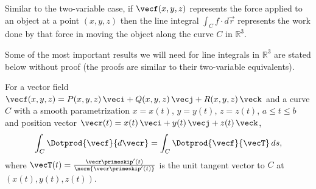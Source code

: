 Similar to the two-variable case, if $\vecf(x,y,z)$ represents the force applied to an object at a point $(x,y,z)$ then the line integral $\int_{C}{f}\cdot d\vec{r}$ represents the work done by that force in moving the object along the curve $C$ in $\mathbb{R}^{3}$.

Some of the most important results we will need for line integrals in $\mathbb{R}^{3}$ are stated below without proof (the proofs are similar to their two-variable equivalents).

\begin{theorem}\label{thm:lineinttangent3}
For a vector field $\vecf(x,y,z) = P(x,y,z)\,\veci + Q(x,y,z)\,\vecj + R(x,y,z)\,\veck$ and a curve $C$ with a smooth parametrization $x=x(t)$, $y=y(t)$, $z=z(t)$, $a \le t \le b$ and position vector $\vecr(t) = x(t)\,\veci + y(t)\,\vecj + z(t)\,\veck$,
 \[
  \int_C \Dotprod{\vecf}{d\vecr} = \int_C \Dotprod{\vecf}{\vecT}\,ds ,
 \]
 where $\vecT(t) = \frac{\vecr\primeskip'(t)}{\norm{\vecr\primeskip'(t)}}$ is the unit tangent vector to $C$ at $(x(t),y(t),z(t))$.
\end{theorem}




